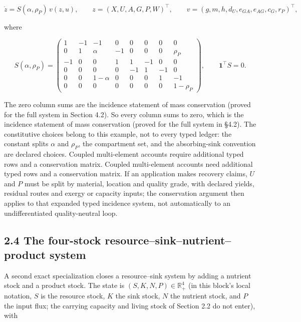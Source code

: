 \documentclass[11pt]{article}
\begin{document}
$$\dot z = S(\alpha, \rho_P)\, v(z, u), \qquad z = (X, U, A, G, P, W)^\top, \qquad v = (g, m, h, d_U, e_{GA}, e_{AG}, c_G, r_P)^\top,$$

 where 

$$S(\alpha, \rho_P) = \begin{pmatrix} 1 & -1 & -1 & 0 & 0 & 0 & 0 & 0 \\ 0 & 1 & \alpha & -1 & 0 & 0 & 0 & \rho_P \\ -1 & 0 & 0 & 1 & 1 & -1 & 0 & 0 \\ 0 & 0 & 0 & 0 & -1 & 1 & -1 & 0 \\ 0 & 0 & 1-\alpha & 0 & 0 & 0 & 1 & -1 \\ 0 & 0 & 0 & 0 & 0 & 0 & 0 & 1-\rho_P \end{pmatrix}, \qquad \mathbf{1}^\top S = 0.$$

 The zero column sums are the incidence statement of mass conservation (proved for the full system in Section 4.2). So every column sums to zero, which is the incidence statement of mass conservation (proved for the full system in \S4.2). The constitutive choices belong to this example, not to every typed ledger: the constant splits \(\alpha\) and \(\rho_P\), the compartment set, and the absorbing-sink convention are declared choices. Coupled multi-element accounts require additional typed rows and a conservation matrix. Coupled multi-element accounts need additional typed rows and a conservation matrix. If an application makes recovery claims, \(U\) and \(P\) must be split by material, location and quality grade, with declared yields, residual routes and exergy or capacity inputs; the conservation argument then applies to that expanded typed incidence system, not automatically to an undifferentiated quality-neutral loop.

\subsection*{2.4 The four-stock resource--sink--nutrient--product system}\label{24-the-four-stock-resource--sink--nutrient--product-system}

A second exact specialization closes a resource--sink system by adding a nutrient stock and a product stock. The state is \((S,\allowbreak{} K,\allowbreak{} N,\allowbreak{} P) \in \mathbb{R}^4_+\allowbreak{}\) (in this block's local notation, \(S\) is the resource stock, \(K\) the sink stock, \(N\) the nutrient stock, and \(P\) the input flux; the carrying capacity and living stock of Section 2.2 do not enter), with 
\end{document}
